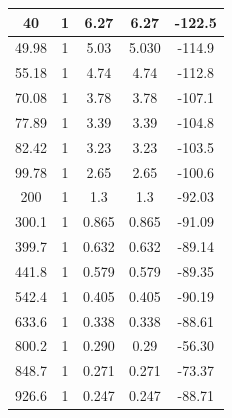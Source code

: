 \begin{itemize}
\begin{center}
\begin{tabular}{|c|c|c|c|c|}
         \hline
         40 & 1 & 6.27 & 6.27 & -122.5 \\
         \hline
         49.98 & 1 & 5.03 & 5.030 & -114.9 \\
         \hline
         55.18 & 1 & 4.74 & 4.74 & -112.8 \\
         \hline
         70.08 & 1 & 3.78 & 3.78 & -107.1 \\
         \hline
         77.89 & 1 & 3.39 & 3.39 & -104.8 \\
         \hline
         82.42 & 1 & 3.23 & 3.23 & -103.5 \\
         \hline
         99.78 & 1 & 2.65 & 2.65 & -100.6 \\
         \hline
         200 & 1 & 1.3 & 1.3 & -92.03 \\
         \hline
         300.1 & 1 & 0.865 & 0.865 & -91.09 \\
         \hline
         399.7 & 1 & 0.632 & 0.632 & -89.14 \\
         \hline
         441.8 & 1 & 0.579 & 0.579 & -89.35 \\
         \hline
         542.4 & 1 & 0.405 & 0.405 & -90.19 \\
         \hline
         633.6 & 1 & 0.338 & 0.338 & -88.61 \\
         \hline
         800.2 & 1 & 0.290 & 0.29 & -56.30 \\
         \hline
         848.7 & 1 & 0.271 & 0.271 & -73.37 \\
         \hline
         926.6 & 1 & 0.247 & 0.247 & -88.71 \\
         \hline
    \end{tabular}
    \end{center}
    \pagebreak
    

\end{itemize}
